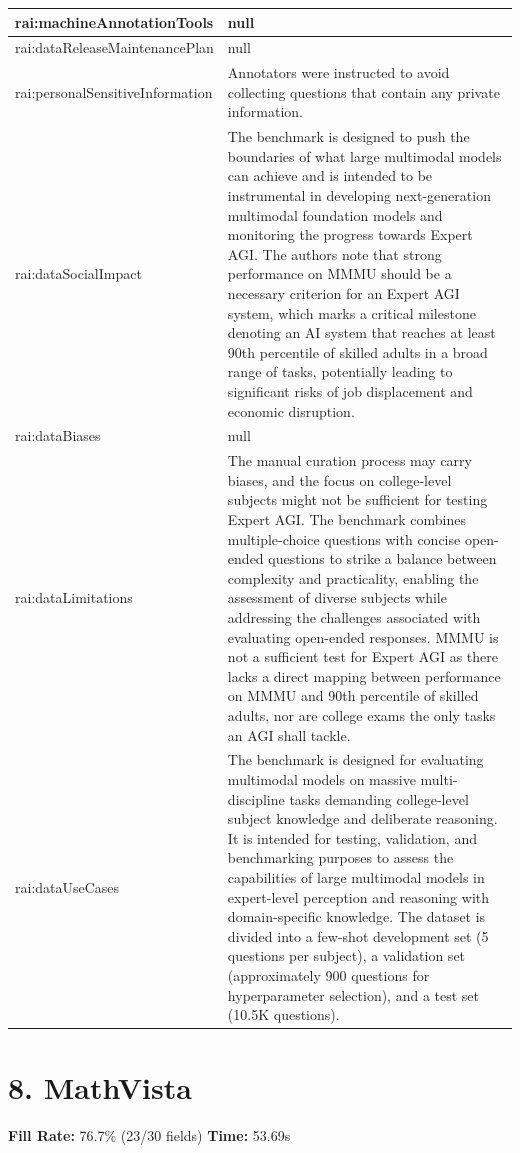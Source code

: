 \documentclass[10pt,a4paper]{article}
\begin{document}
\begin{longtable}{|p{4cm}|p{12cm}|}
\hline
rai:machineAnnotationTools & null \\
\hline
rai:dataReleaseMaintenancePlan & null \\
\hline
rai:personalSensitiveInformation & Annotators were instructed to avoid collecting questions that contain any private information. \\
\hline
rai:dataSocialImpact & The benchmark is designed to push the boundaries of what large multimodal models can achieve and is intended to be instrumental in developing next-generation multimodal foundation models and monitoring the progress towards Expert AGI. The authors note that strong performance on MMMU should be a necessary criterion for an Expert AGI system, which marks a critical milestone denoting an AI system that reaches at least 90th percentile of skilled adults in a broad range of tasks, potentially leading to significant risks of job displacement and economic disruption. \\
\hline
rai:dataBiases & null \\
\hline
rai:dataLimitations & The manual curation process may carry biases, and the focus on college-level subjects might not be sufficient for testing Expert AGI. The benchmark combines multiple-choice questions with concise open-ended questions to strike a balance between complexity and practicality, enabling the assessment of diverse subjects while addressing the challenges associated with evaluating open-ended responses. MMMU is not a sufficient test for Expert AGI as there lacks a direct mapping between performance on MMMU and 90th percentile of skilled adults, nor are college exams the only tasks an AGI shall tackle. \\
\hline
rai:dataUseCases & The benchmark is designed for evaluating multimodal models on massive multi-discipline tasks demanding college-level subject knowledge and deliberate reasoning. It is intended for testing, validation, and benchmarking purposes to assess the capabilities of large multimodal models in expert-level perception and reasoning with domain-specific knowledge. The dataset is divided into a few-shot development set (5 questions per subject), a validation set (approximately 900 questions for hyperparameter selection), and a test set (10.5K questions). \\
\hline
\end{longtable}

\newpage

\section*{8. MathVista}
\textbf{Fill Rate:} 76.7\% (23/30 fields) \quad \textbf{Time:} 53.69s
\end{document}
